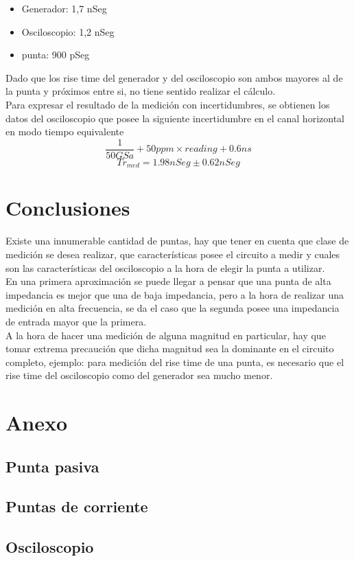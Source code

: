 \documentclass[a4paper,10pt]{article}
\begin{document}
		\begin{itemize}
			\item Generador: 1,7 nSeg  
			\item Osciloscopio: 1,2 nSeg
			\item punta: 900 pSeg
		\end{itemize}
		\indent Dado que los rise time del generador y del osciloscopio son 
		ambos mayores al de la punta y próximos entre si, no tiene sentido 
		realizar el cálculo. \\
		\indent Para expresar el resultado de la medición con incertidumbres,
		se obtienen los datos del osciloscopio que posee la siguiente 
		incertidumbre en el canal horizontal en modo tiempo equivalente
		$$\frac{1}{50GSa} + 50ppm × reading
		+ 0.6 ns$$
		$$Tr_{med} = 1.98 nSeg \pm 0.62 nSeg$$

	\newpage
	\section{Conclusiones}
	\indent Existe una innumerable cantidad de puntas, hay que tener en cuenta
	que clase de medición se desea realizar, que características posee el 
	circuito a medir y cuales son las características del osciloscopio a la 
	hora de elegir la punta a utilizar. \\
	\indent En una primera aproximación se puede llegar a pensar que una punta
	de alta impedancia es mejor que una de baja impedancia, pero a la hora de
	realizar una medición en alta frecuencia, se da el caso que la segunda 
	posee una impedancia de entrada mayor que la primera.\\
	\indent A la hora de hacer una medición de alguna magnitud en particular,
	hay que tomar extrema precaución que dicha magnitud sea la dominante en el
	circuito completo, ejemplo: para medición del rise time de una punta, es 
	necesario que el rise time del osciloscopio como del generador sea mucho 
	menor. 
	
	\newpage
	\section{Anexo}
	\subsection{Punta pasiva}
	

	\newpage
	\subsection{Puntas de corriente}
	
	
	
	\newpage
	\subsection{Osciloscopio}
	
\end{document}
